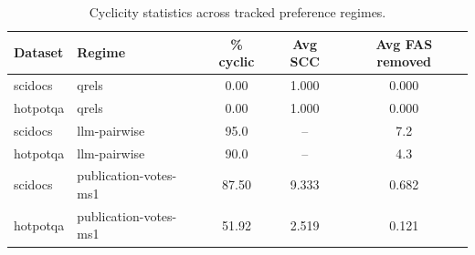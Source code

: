 \begin{table}[t]
\centering
\caption{Cyclicity statistics across tracked preference regimes.}
\label{tab:cyclicity_stats}
\begin{tabular}{llccc}
\toprule
Dataset & Regime & \% cyclic & Avg SCC & Avg FAS removed \\
\midrule
scidocs & qrels & 0.00 & 1.000 & 0.000 \\
hotpotqa & qrels & 0.00 & 1.000 & 0.000 \\
scidocs & llm-pairwise & 95.0 & -- & 7.2 \\
hotpotqa & llm-pairwise & 90.0 & -- & 4.3 \\
scidocs & publication-votes-ms1 & 87.50 & 9.333 & 0.682 \\
hotpotqa & publication-votes-ms1 & 51.92 & 2.519 & 0.121 \\
\bottomrule
\end{tabular}
\end{table}
